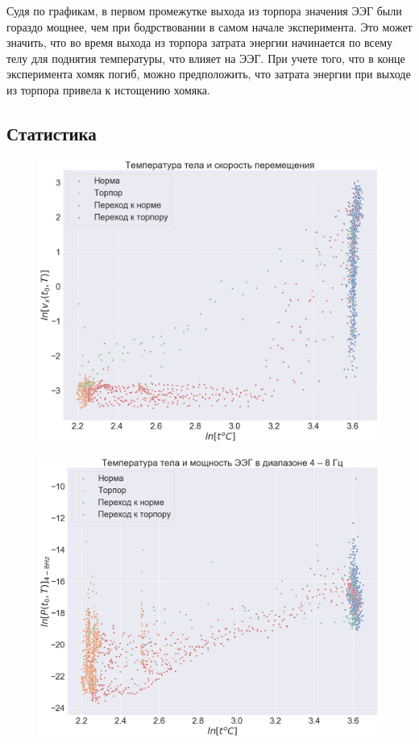 \documentclass[12pt,a4paper,oneside]{article}
\begin{document}
Судя по графикам, в первом промежутке выхода из торпора значения ЭЭГ были гораздо мощнее, чем при бодрствовании в самом начале эксперимента. Это может значить, что во время выхода из торпора затрата энергии начинается по всему телу для поднятия температуры, что влияет на ЭЭГ. При учете того, что в конце эксперимента хомяк погиб, можно предположить, что затрата энергии при выходе из торпора привела к истощению хомяка. 

\subsection{Статистика}

\begin{figure}[H]
\centering
\begin{minipage}{.5\textwidth}
  \centering
  \includegraphics[width=\textwidth]{t_vs_speed.png}
  \label{fig:t_vs_speed}
\end{minipage}%
\begin{minipage}{.5\textwidth}
  \centering
  \includegraphics[width=\textwidth]{t_vs_p.png}
  \label{fig:t_vs_p}
\end{minipage}
\end{figure}
\end{document}
